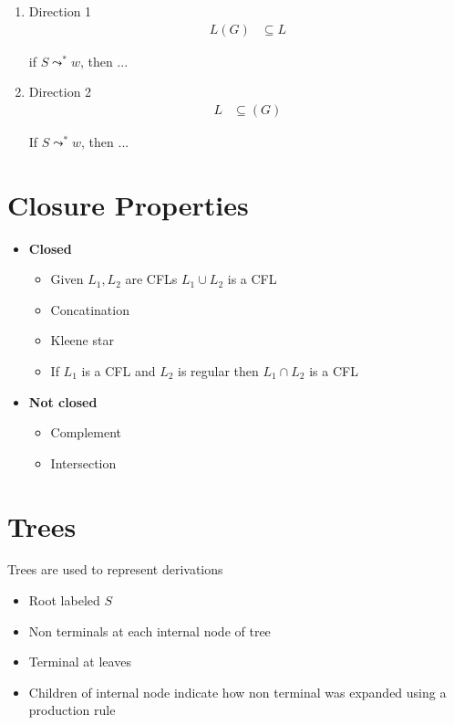   \begin{enumerate}
    \item Direction 1
    \begin{align*}
      L \left( G \right) &\subseteq L
    \end{align*}

    if $ S \leadsto^{*} w $, then ...

    \item Direction 2
    \begin{align*}
      L &\subseteq \left( G \right)
    \end{align*}

    If $ S \leadsto^{*} w $, then ...
  \end{enumerate}

\section{Closure Properties}

  \begin{itemize}
    \item \textbf{Closed}
    \begin{itemize}
      \item Given $ L_{1}, L_{2} $ are CFLs $ L_{1} \cup L_{2} $ is a CFL
      \item Concatination
      \item Kleene star
      \item If $ L_{1} $ is a CFL and $ L_{2} $ is regular then
      $ L_{1} \cap L_{2} $ is a CFL
    \end{itemize}

    \item \textbf{Not closed}
    \begin{itemize}
      \item Complement
      \item Intersection
    \end{itemize}
  \end{itemize}

\section{Trees}

  Trees are used to represent derivations

  \begin{itemize}
    \item Root labeled $ S $
    \item Non terminals at each internal node of tree
    \item Terminal at leaves
    \item Children of internal node indicate how non terminal was expanded
    using a production rule
  \end{itemize}

